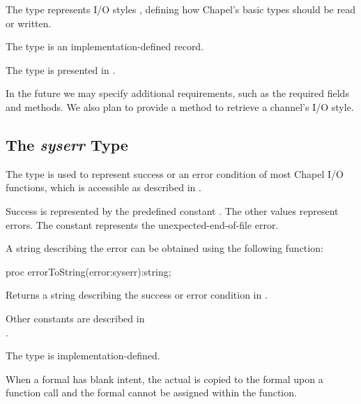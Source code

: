 The  type represents I/O styles ,
defining how Chapel's basic types should be read or written.

The  type is an implementation-defined record.

\begin{craychapel}
The  type is presented in
.
\end{craychapel}

\begin{future}
In the future we may specify additional requirements, such as
the required  fields and methods.
We also plan to provide a method to retrieve a channel's I/O style.
\end{future}


\subsection{The {\em syserr} Type}
\label{IO_syserr_type}

The  type is used to represent success or an error
condition of most Chapel I/O functions, which is accessible as
described in .

Success is represented by the predefined constant .
The other values represent errors.
The constant  represents the unexpected-end-of-file error.

A string describing the error can be obtained using the following function:

\begin{protohead}
proc errorToString(error:syserr):string;
\end{protohead}
\begin{protobody}
Returns a string describing the success or error condition in .
\end{protobody}

\begin{craychapel}
Other  constants are described in
\\ %
.
\end{craychapel}

The  type is implementation-defined.

When a  formal has blank intent, the
actual is copied to the formal upon a function call and
the formal cannot be assigned within the function.

